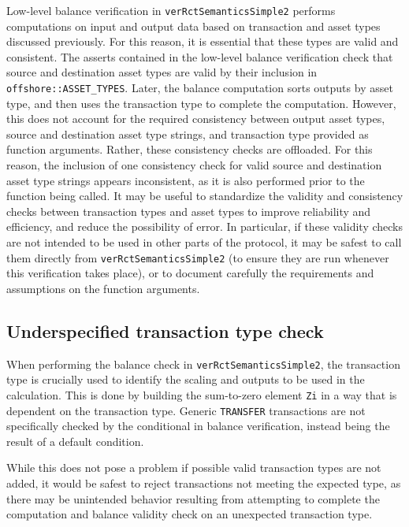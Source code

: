 \documentclass{article}
\begin{document}
Low-level balance verification in \texttt{verRctSemanticsSimple2} performs computations on input and output data based on transaction and asset types discussed previously.
For this reason, it is essential that these types are valid and consistent.
The asserts contained in the low-level balance verification check that source and destination asset types are valid by their inclusion in \texttt{offshore::ASSET\_TYPES}.
Later, the balance computation sorts outputs by asset type, and then uses the transaction type to complete the computation.
However, this does not account for the required consistency between output asset types, source and destination asset type strings, and transaction type provided as function arguments.
Rather, these consistency checks are offloaded.
For this reason, the inclusion of one consistency check for valid source and destination asset type strings appears inconsistent, as it is also performed prior to the function being called.
It may be useful to standardize the validity and consistency checks between transaction types and asset types to improve reliability and efficiency, and reduce the possibility of error.
In particular, if these validity checks are not intended to be used in other parts of the protocol, it may be safest to call them directly from \texttt{verRctSemanticsSimple2} (to ensure they are run whenever this verification takes place), or to document carefully the requirements and assumptions on the function arguments.


\subsection{Underspecified transaction type check}
\label{obs:transaction-type-check}

When performing the balance check in \texttt{verRctSemanticsSimple2}, the transaction type is crucially used to identify the scaling and outputs to be used in the calculation.
This is done by building the sum-to-zero element \texttt{Zi} in a way that is dependent on the transaction type.
Generic \texttt{TRANSFER} transactions are not specifically checked by the conditional in balance verification, instead being the result of a default condition.

While this does not pose a problem if possible valid transaction types are not added, it would be safest to reject transactions not meeting the expected type, as there may be unintended behavior resulting from attempting to complete the computation and balance validity check on an unexpected transaction type.
\end{document}

